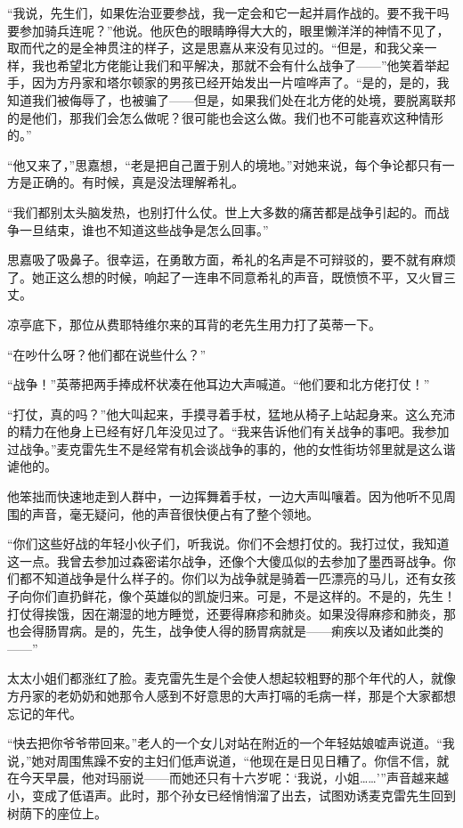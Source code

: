 \par “我说，先生们，如果佐治亚要参战，我一定会和它一起并肩作战的。要不我干吗要参加骑兵连呢？”他说。他灰色的眼睛睁得大大的，眼里懒洋洋的神情不见了，取而代之的是全神贯注的样子，这是思嘉从来没有见过的。“但是，和我父亲一样，我也希望北方佬能让我们和平解决，那就不会有什么战争了——”他笑着举起手，因为方丹家和塔尔顿家的男孩已经开始发出一片喧哗声了。“是的，是的，我知道我们被侮辱了，也被骗了——但是，如果我们处在北方佬的处境，要脱离联邦的是他们，那我们会怎么做呢？很可能也会这么做。我们也不可能喜欢这种情形的。”
\par “他又来了，”思嘉想，“老是把自己置于别人的境地。”对她来说，每个争论都只有一方是正确的。有时候，真是没法理解希礼。
\par “我们都别太头脑发热，也别打什么仗。世上大多数的痛苦都是战争引起的。而战争一旦结束，谁也不知道这些战争是怎么回事。”
\par 思嘉吸了吸鼻子。很幸运，在勇敢方面，希礼的名声是不可辩驳的，要不就有麻烦了。她正这么想的时候，响起了一连串不同意希礼的声音，既愤愤不平，又火冒三丈。
\par 凉亭底下，那位从费耶特维尔来的耳背的老先生用力打了英蒂一下。
\par “在吵什么呀？他们都在说些什么？”
\par “战争！”英蒂把两手捧成杯状凑在他耳边大声喊道。“他们要和北方佬打仗！”
\par “打仗，真的吗？”他大叫起来，手摸寻着手杖，猛地从椅子上站起身来。这么充沛的精力在他身上已经有好几年没见过了。“我来告诉他们有关战争的事吧。我参加过战争。”麦克雷先生不是经常有机会谈战争的事的，他的女性街坊邻里就是这么谐谑他的。
\par 他笨拙而快速地走到人群中，一边挥舞着手杖，一边大声叫嚷着。因为他听不见周围的声音，毫无疑问，他的声音很快便占有了整个领地。
\par “你们这些好战的年轻小伙子们，听我说。你们不会想打仗的。我打过仗，我知道这一点。我曾去参加过森密诺尔战争，还像个大傻瓜似的去参加了墨西哥战争。你们都不知道战争是什么样子的。你们以为战争就是骑着一匹漂亮的马儿，还有女孩子向你们直扔鲜花，像个英雄似的凯旋归来。可是，不是这样的。不是的，先生！打仗得挨饿，因在潮湿的地方睡觉，还要得麻疹和肺炎。如果没得麻疹和肺炎，那也会得肠胃病。是的，先生，战争使人得的肠胃病就是——痢疾以及诸如此类的——”
\par 太太小姐们都涨红了脸。麦克雷先生是个会使人想起较粗野的那个年代的人，就像方丹家的老奶奶和她那令人感到不好意思的大声打嗝的毛病一样，那是个大家都想忘记的年代。
\par “快去把你爷爷带回来。”老人的一个女儿对站在附近的一个年轻姑娘嘘声说道。“我说，”她对周围焦躁不安的主妇们低声说道，“他现在是日见日糟了。你信不信，就在今天早晨，他对玛丽说——而她还只有十六岁呢：‘我说，小姐……'”声音越来越小，变成了低语声。此时，那个孙女已经悄悄溜了出去，试图劝诱麦克雷先生回到树荫下的座位上。
